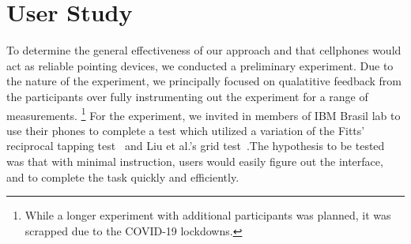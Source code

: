 \section{User Study}

To determine the general effectiveness of our approach and that cellphones
would act as reliable pointing devices, we conducted a preliminary experiment.
Due to the nature of the experiment, we principally focused on qualatitive
feedback from the participants over fully instrumenting out the experiment for
a range of measurements. \footnote{While a longer experiment with additional 
participants was planned, it was scrapped due to the COVID-19 lockdowns.}
For the experiment, we invited in members of IBM Brasil lab to use their phones 
to complete a test which utilized a variation of the Fitts' reciprocal tapping 
test~\cite{fitts_information_1954} and Liu et al.'s grid 
test~\cite{liu_effects_2014}.The hypothesis to be tested was that with minimal 
instruction, users would easily figure out the interface, and to complete the 
task quickly and efficiently.








